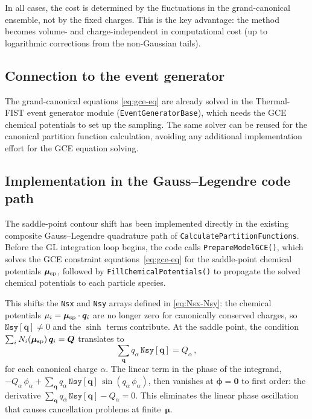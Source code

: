 \documentclass[11pt,a4paper]{article}
\newcommand{\bphi}{\bm{\phi}}
\newcommand{\bq}{\bm{q}}
\newcommand{\bQ}{\bm{Q}}
\begin{document}
In all cases, the cost is determined by the fluctuations in the grand-canonical ensemble, not by the fixed charges.
This is the key advantage: the method becomes volume- and charge-independent in computational cost (up to logarithmic corrections from the non-Gaussian tails).

\subsection{Connection to the event generator}

The grand-canonical equations \cref{eq:gce-eq} are already solved in the Thermal-FIST event generator module (\texttt{EventGeneratorBase}), which needs the GCE chemical potentials to set up the sampling.
The same solver can be reused for the canonical partition function calculation, avoiding any additional implementation effort for the GCE equation solving.

\subsection{Implementation in the Gauss--Legendre code path}
\label{sec:gl-contour-shift}

The saddle-point contour shift has been implemented directly in the existing composite Gauss--Legendre quadrature path of \texttt{CalculatePartitionFunctions}.
Before the GL integration loop begins, the code calls \texttt{PrepareModelGCE()}, which solves the GCE constraint equations~\cref{eq:gce-eq} for the saddle-point chemical potentials $\bm{\mu}_{\rm sp}$, followed by \texttt{FillChemicalPotentials()} to propagate the solved chemical potentials to each particle species.

This shifts the \texttt{Nsx} and \texttt{Nsy} arrays defined in \cref{eq:Nsx-Nsy}: the chemical potentials $\mu_i = \bm{\mu}_{\rm sp} \cdot \bq_i$ are no longer zero for canonically conserved charges, so $\texttt{Nsy}[\bq] \neq 0$ and the $\sinh$ terms contribute.
At the saddle point, the condition $\sum_i N_i(\bm{\mu}_{\rm sp})\,\bq_i = \bQ$ translates to
\begin{equation}\label{eq:nsy-cancellation}
  \sum_{\bq} q_\alpha\,\texttt{Nsy}[\bq] = Q_\alpha\,,
\end{equation}
for each canonical charge $\alpha$.
The linear term in the phase of the integrand, $-Q_\alpha\,\phi_\alpha + \sum_{\bq} q_\alpha\,\texttt{Nsy}[\bq]\,\sin(q_\alpha\,\phi_\alpha)$, then vanishes at $\bphi = \bm{0}$ to first order: the derivative $\sum_{\bq} q_\alpha\,\texttt{Nsy}[\bq] - Q_\alpha = 0$.
This eliminates the linear phase oscillation that causes cancellation problems at finite~$\bm{\mu}$.
\end{document}
